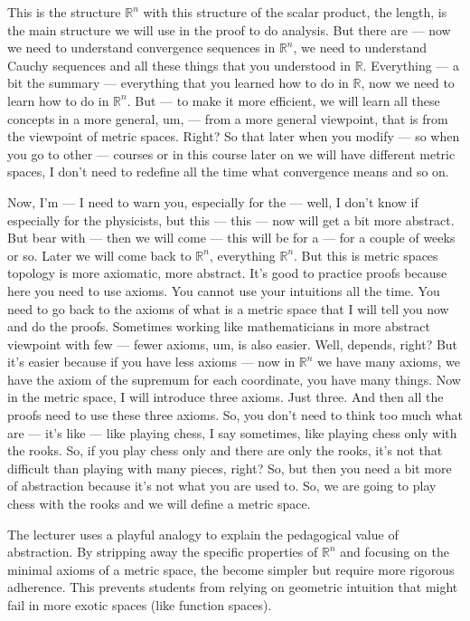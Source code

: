 \begin{spoken-clean}[00:10:30 - 00:12:50]
This is the structure $\mathbb{R}^n$ with this structure of the scalar product, the length, is the main structure we will use in the proof to do analysis. But there are --- now we need to understand convergence sequences in $\mathbb{R}^n$, we need to understand Cauchy sequences and all these things that you understood in $\mathbb{R}$. Everything --- a bit the summary --- everything that you learned how to do in $\mathbb{R}$, now we need to learn how to do in $\mathbb{R}^n$. But --- to make it more efficient, we will learn all these concepts in a more general, um, --- from a more general viewpoint, that is from the viewpoint of metric spaces. Right? So that later when you modify --- so when you go to other --- courses or in this course later on we will have different metric spaces, I don't need to redefine all the time what convergence means and so on.

Now, I'm --- I need to warn you, especially for the --- well, I don't know if especially for the physicists, but this --- this --- now will get a bit more abstract. But bear with --- then we will come --- this will be for a --- for a couple of weeks or so. Later we will come back to $\mathbb{R}^n$, everything $\mathbb{R}^n$. But this is metric spaces topology is more axiomatic, more abstract. It's good to practice proofs because here you need to use axioms. You cannot use your intuitions all the time. You need to go back to the axioms of what is a metric space that I will tell you now and do the proofs. Sometimes working like mathematicians in more abstract viewpoint with few --- fewer axioms, um, is also easier. Well, depends, right? But it's easier because if you have less axioms --- now in $\mathbb{R}^n$ we have many axioms, we have the axiom of the supremum for each coordinate, you have many things. Now in the metric space, I will introduce three axioms. Just three. And then all the proofs need to use these three axioms. So, you don't need to think too much what are --- it's like --- like playing chess, I say sometimes, like playing chess only with the rooks. So, if you play chess only and there are only the rooks, it's not that difficult than playing with many pieces, right? So, but then you need a bit more of abstraction because it's not what you are used to. So, we are going to play chess with the rooks and we will define a metric space.
\end{spoken-clean}

\begin{didactic-insight}
The lecturer uses a playful analogy to explain the pedagogical value of abstraction. By stripping away the specific properties of $\mathbb{R}^n$ and focusing on the minimal axioms of a metric space, the  become simpler but require more rigorous adherence. This prevents students from relying on geometric intuition that might fail in more exotic spaces (like function spaces).
\end{didactic-insight}

